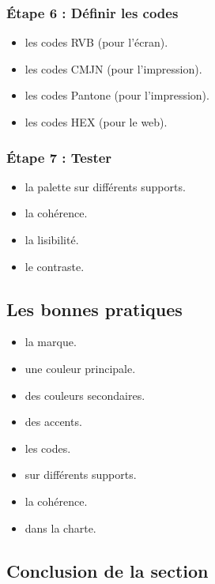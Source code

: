 \subsubsection{Étape 6 : Définir les codes}

\begin{itemize}
    \item {} les codes RVB (pour l'écran).
    \item {} les codes CMJN (pour l'impression).
    \item {} les codes Pantone (pour l'impression).
    \item {} les codes HEX (pour le web).
\end{itemize}

\subsubsection{Étape 7 : Tester}

\begin{itemize}
    \item {} la palette sur différents supports.
    \item {} la cohérence.
    \item {} la lisibilité.
    \item {} le contraste.
\end{itemize}

\subsection{Les bonnes pratiques}

\begin{itemize}
    \item {} la marque.
    \item {} une couleur principale.
    \item {} des couleurs secondaires.
    \item {} des accents.
    \item {} les codes.
    \item {} sur différents supports.
    \item {} la cohérence.
    \item {} dans la charte.
\end{itemize}

\subsection*{Conclusion de la section}

